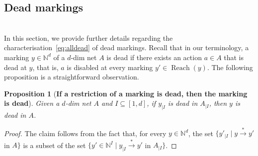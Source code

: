 \documentclass[11pt,a4paper]{amsart}
\DeclareMathOperator{\Reach}{Reach}
\newcommand{\step}[1]{\mathrel{\xrightarrow{#1}}}
\newcommand{\reach}{\step{*}}
\newcommand{\Nat}{\mathbb{N}}
\newcommand{\restr}[1]{_{|{#1}}}
\newcommand{\setN}{\Nat}
\theoremstyle{plain}
\newtheorem{prop}[thm]{Proposition}
\theoremstyle{definition}
\theoremstyle{defC}
\theoremstyle{thmC}
\begin{document}
\subsection{Dead markings}\label{subsec:dead}
\hfill\\

In this section, we provide further details regarding the
characterisation~\eqref{eq:alldead} of dead markings.
Recall that in our terminology, a marking $y\in\setN^d$ of a $d$-dim net $A$
is dead if there exists an action $a\in A$ that is dead at $y$, that is,
$a$ is disabled at every marking $y'\in\Reach(y)$. The following
proposition is a straightforward observation.
\begin{prop}[\textbf{If a restriction of a marking is dead, then the
	marking is dead}]\label{prop:restrdead}
	Given a $d$-dim net $A$ and $I\subseteq [1,d]$, if 
 $y\restr{I}$ is dead in $A\restr{I}$, then $y$ is dead in $A$.
\end{prop}
\begin{proof}
The claim follows from the fact that, for every $y\in\setN^d$, the set
$\{y'\restr{I}\mid y\reach y'$ in $A\}$ is a subset of the set
$\{y'\in\setN^I\mid y\restr{I}\reach y'$ in $A\restr{I}\}$.
\end{proof}
\end{document}
